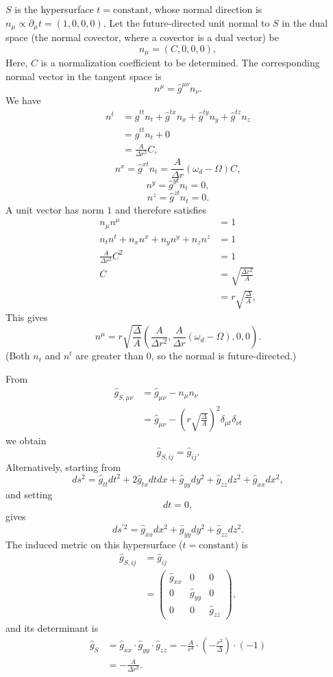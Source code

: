 \documentclass[english]{article}
\begin{document}
$S$ is the hypersurface $t=\text{constant}$, whose normal direction
is $n_{\mu}\propto\partial_{\mu}t=\left(1,0,0,0\right)$. Let the
future-directed unit normal to $S$ in the dual space (the normal
covector, where a covector is a dual vector) be 
\[
n_{\mu}=\left(C,0,0,0\right),
\]
 Here, $C$ is a normalization coefficient to be determined. The corresponding
normal vector in the tangent space is 
\[
n^{\mu}=\hat{g}^{\mu\nu}n_{\nu}.
\]
 We have 
\begin{align*}
n^{t} & =\hat{g}^{tt}n_{t}+\hat{g}^{tx}n_{x}+\hat{g}^{ty}n_{y}+\hat{g}^{tz}n_{z}\\
 & =\hat{g}^{tt}n_{t}+0\\
 & =\frac{A}{\Delta r^{2}}C,
\end{align*}
 {}
\[
n^{x}=\hat{g}^{xt}n_{t}=\frac{A}{\Delta r}\left(\omega_{d}-\Omega\right)C,
\]
 {}
\[
n^{y}=\hat{g}^{yt}n_{t}=0,
\]
 {}
\[
n^{z}=\hat{g}^{zt}n_{t}=0.
\]
 A unit vector has norm $1$ and therefore satisfies 
\begin{align*}
n_{\mu}n^{\mu} & =1\\
n_{t}n^{t}+n_{x}n^{x}+n_{y}n^{y}+n_{z}n^{z} & =1\\
\frac{A}{\Delta r^{2}}C^{2} & =1\\
C & =\sqrt{\frac{\Delta r^{2}}{A}}\\
 & =r\sqrt{\frac{\Delta}{A}},
\end{align*}
 This gives 
\[
n^{\mu}=r\sqrt{\frac{\Delta}{A}}\left(\frac{A}{\Delta r^{2}},\frac{A}{\Delta r}\left(\omega_{d}-\Omega\right),0,0\right).
\]
 (Both $n_{t}$ and $n^{t}$ are greater than $0$, so the normal
is future-directed.)

From 
\begin{align*}
\hat{g}_{S,\mu\nu} & =\hat{g}_{\mu\nu}-n_{\mu}n_{\nu}\\
 & =\hat{g}_{\mu\nu}-\left(r\sqrt{\frac{\Delta}{A}}\right)^{2}\delta_{\mu t}\delta_{\nu t}
\end{align*}
 we obtain 
\[
\hat{g}_{S,ij}=\hat{g}_{ij}.
\]
 Alternatively, starting from 
\[
ds^{2}=\hat{g}_{tt}dt^{2}+2\hat{g}_{tx}dtdx+\hat{g}_{yy}dy^{2}+\hat{g}_{zz}dz^{2}+\hat{g}_{xx}dx^{2},
\]
 and setting 
\[
dt=0,
\]
 gives 
\[
ds^{'2}=\hat{g}_{xx}dx^{2}+\hat{g}_{yy}dy^{2}+\hat{g}_{zz}dz^{2}.
\]
 The induced metric on this hypersurface ($t=\text{constant}$) is
\begin{align*}
\hat{g}_{S,ij} & =\hat{g}_{ij}\\
 & =\begin{pmatrix}\hat{g}_{xx} & 0 & 0\\
0 & \hat{g}_{yy} & 0\\
0 & 0 & \hat{g}_{zz}
\end{pmatrix},
\end{align*}
 and its determinant is 
\begin{align*}
\hat{g}_{S} & =\hat{g}_{xx}\cdot\hat{g}_{yy}\cdot\hat{g}_{zz}=-\frac{A}{r^{4}}\cdot\left(-\frac{r^{2}}{\Delta}\right)\cdot\left(-1\right)\\
 & =-\frac{A}{\Delta r^{2}}.
\end{align*}
\end{document}
